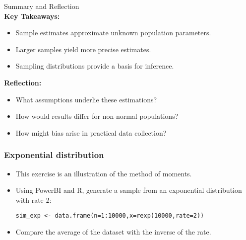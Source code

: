 \documentclass[main.tex]{subfiles}
\begin{document}
\begin{frame}
\begin{block}{Summary and Reflection\\}
\textbf{Key Takeaways:}
\begin{itemize}
  \item Sample estimates approximate unknown population parameters.
  \item Larger samples yield more precise estimates.
  \item Sampling distributions provide a basis for inference.
\end{itemize}

\textbf{Reflection:}
\begin{itemize}
  \item What assumptions underlie these estimations?
  \item How would results differ for non-normal populations?
  \item How might bias arise in practical data collection?
\end{itemize}
\end{block}
\end{frame}
\begin{frame}[fragile]
    \frametitle{Exponential distribution}
    \begin{itemize}
        \item<+-> This exercise is an illustration of the method of moments.
        \item<+-> Using PowerBI and R, generate a sample from an exponential distribution with rate 2:
\begin{verbatim}
sim_exp <- data.frame(n=1:10000,x=rexp(10000,rate=2))
\end{verbatim}
        \item<+-> Compare the average of the dataset with the inverse of the rate. 
    \end{itemize}
\end{frame}
\end{document}
